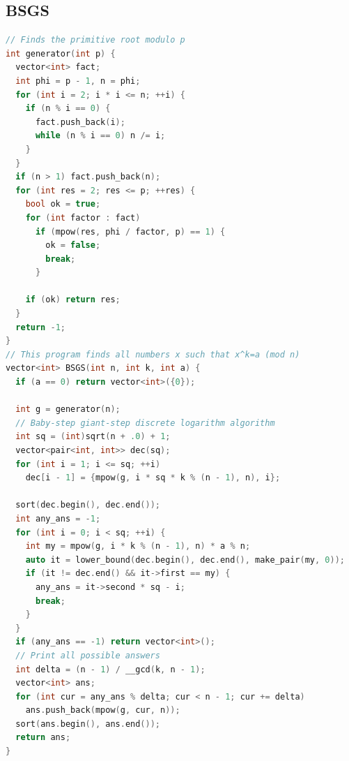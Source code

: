 \documentclass[twoside]{article}
\begin{document}
\subsection{BSGS}
\begin{lstlisting}[language=c++]
// Finds the primitive root modulo p
int generator(int p) {
  vector<int> fact;
  int phi = p - 1, n = phi;
  for (int i = 2; i * i <= n; ++i) {
    if (n % i == 0) {
      fact.push_back(i);
      while (n % i == 0) n /= i;
    }
  }
  if (n > 1) fact.push_back(n);
  for (int res = 2; res <= p; ++res) {
    bool ok = true;
    for (int factor : fact)
      if (mpow(res, phi / factor, p) == 1) {
        ok = false;
        break;
      }

    if (ok) return res;
  }
  return -1;
}
// This program finds all numbers x such that x^k=a (mod n)
vector<int> BSGS(int n, int k, int a) {
  if (a == 0) return vector<int>({0});

  int g = generator(n);
  // Baby-step giant-step discrete logarithm algorithm
  int sq = (int)sqrt(n + .0) + 1;
  vector<pair<int, int>> dec(sq);
  for (int i = 1; i <= sq; ++i)
    dec[i - 1] = {mpow(g, i * sq * k % (n - 1), n), i};

  sort(dec.begin(), dec.end());
  int any_ans = -1;
  for (int i = 0; i < sq; ++i) {
    int my = mpow(g, i * k % (n - 1), n) * a % n;
    auto it = lower_bound(dec.begin(), dec.end(), make_pair(my, 0));
    if (it != dec.end() && it->first == my) {
      any_ans = it->second * sq - i;
      break;
    }
  }
  if (any_ans == -1) return vector<int>();
  // Print all possible answers
  int delta = (n - 1) / __gcd(k, n - 1);
  vector<int> ans;
  for (int cur = any_ans % delta; cur < n - 1; cur += delta)
    ans.push_back(mpow(g, cur, n));
  sort(ans.begin(), ans.end());
  return ans;
}

\end{lstlisting}
\end{document}
